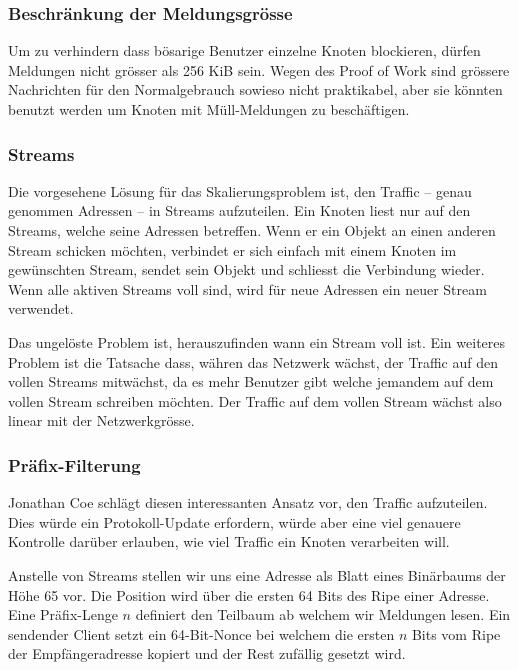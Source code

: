 \documentclass{bfh}
\begin{document}
  \subsubsection{Beschränkung der Meldungsgrösse}
  Um zu verhindern dass bösarige Benutzer einzelne Knoten blockieren, dürfen Meldungen nicht grösser als 256 KiB sein. Wegen des Proof of Work sind grössere Nachrichten für den Normalgebrauch sowieso nicht praktikabel, aber sie könnten benutzt werden um Knoten mit Müll-Meldungen zu beschäftigen.

  \subsubsection{Streams}
  Die vorgesehene Lösung für das Skalierungsproblem ist, den Traffic -- genau genommen Adressen -- in Streams aufzuteilen. Ein Knoten liest nur auf den Streams, welche seine Adressen betreffen. Wenn er ein Objekt an einen anderen Stream schicken möchten, verbindet er sich einfach mit einem Knoten im gewünschten Stream, sendet sein Objekt und schliesst die Verbindung wieder. Wenn alle aktiven Streams voll sind, wird für neue Adressen ein neuer Stream verwendet.

  Das ungelöste Problem ist, herauszufinden wann ein Stream voll ist. Ein weiteres Problem ist die Tatsache dass, währen das Netzwerk wächst, der Traffic auf den vollen Streams mitwächst, da es mehr Benutzer gibt welche jemandem auf dem vollen Stream schreiben möchten. Der Traffic auf dem vollen Stream wächst also linear mit der Netzwerkgrösse.

  \subsubsection{Präfix-Filterung}
  Jonathan Coe schlägt diesen interessanten Ansatz vor, den Traffic aufzuteilen. Dies würde ein Protokoll-Update erfordern, würde aber eine viel genauere Kontrolle darüber erlauben, wie viel Traffic ein Knoten verarbeiten will.\cite{wiki:prefixfilter}

  Anstelle von Streams stellen wir uns eine Adresse als Blatt eines Binärbaums der Höhe 65 vor. Die Position wird über die ersten 64 Bits des Ripe einer Adresse. Eine Präfix-Lenge $n$ definiert den Teilbaum ab welchem wir Meldungen lesen. Ein sendender Client setzt ein 64-Bit-Nonce bei welchem die ersten $n$ Bits vom Ripe der Empfängeradresse kopiert und der Rest zufällig gesetzt wird.
\end{document}
